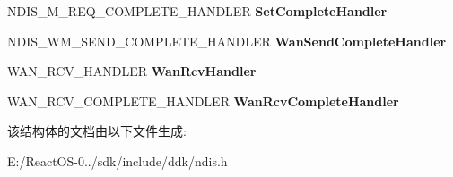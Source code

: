 \begin{DoxyCompactItemize}
\item 
\mbox{\label{struct___n_d_i_s___m_i_n_i_p_o_r_t___b_l_o_c_k_a06c1249675251910431198ede2997e72}} 
N\+D\+I\+S\+\_\+\+M\+\_\+\+R\+E\+Q\+\_\+\+C\+O\+M\+P\+L\+E\+T\+E\+\_\+\+H\+A\+N\+D\+L\+ER {\bfseries Set\+Complete\+Handler}
\item 
\mbox{\label{struct___n_d_i_s___m_i_n_i_p_o_r_t___b_l_o_c_k_a7f33cd8d5e21f9590c0d8f2724c4ae31}} 
N\+D\+I\+S\+\_\+\+W\+M\+\_\+\+S\+E\+N\+D\+\_\+\+C\+O\+M\+P\+L\+E\+T\+E\+\_\+\+H\+A\+N\+D\+L\+ER {\bfseries Wan\+Send\+Complete\+Handler}
\item 
\mbox{\label{struct___n_d_i_s___m_i_n_i_p_o_r_t___b_l_o_c_k_ab5952612c013b4d0f6d692b3eede2a84}} 
W\+A\+N\+\_\+\+R\+C\+V\+\_\+\+H\+A\+N\+D\+L\+ER {\bfseries Wan\+Rcv\+Handler}
\item 
\mbox{\label{struct___n_d_i_s___m_i_n_i_p_o_r_t___b_l_o_c_k_abc9b6a0de2e570a0edc8c01c5af9c268}} 
W\+A\+N\+\_\+\+R\+C\+V\+\_\+\+C\+O\+M\+P\+L\+E\+T\+E\+\_\+\+H\+A\+N\+D\+L\+ER {\bfseries Wan\+Rcv\+Complete\+Handler}
\end{DoxyCompactItemize}


该结构体的文档由以下文件生成\+:\begin{DoxyCompactItemize}
\item 
E\+:/\+React\+O\+S-\/0../sdk/include/ddk/ndis.\+h\end{DoxyCompactItemize}
